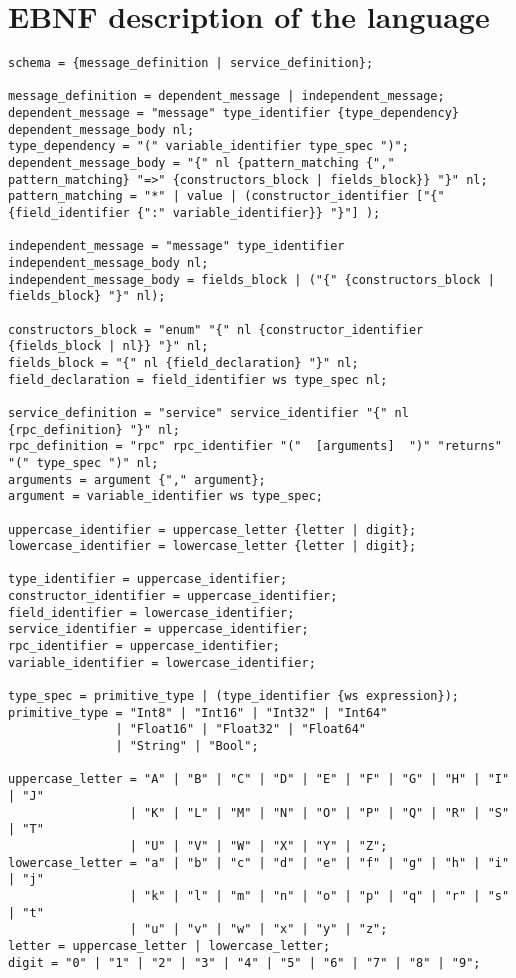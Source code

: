 \documentclass[conference]{IEEEtran}
\begin{document}
\section{EBNF description of the language}
\label{FirstAppendix}
\begin{lstlisting}
schema = {message_definition | service_definition};

message_definition = dependent_message | independent_message;
dependent_message = "message" type_identifier {type_dependency} dependent_message_body nl;
type_dependency = "(" variable_identifier type_spec ")";
dependent_message_body = "{" nl {pattern_matching {"," pattern_matching} "=>" {constructors_block | fields_block}} "}" nl;
pattern_matching = "*" | value | (constructor_identifier ["{" {field_identifier {":" variable_identifier}} "}"] );

independent_message = "message" type_identifier independent_message_body nl;
independent_message_body = fields_block | ("{" {constructors_block | fields_block} "}" nl);

constructors_block = "enum" "{" nl {constructor_identifier {fields_block | nl}} "}" nl;
fields_block = "{" nl {field_declaration} "}" nl;
field_declaration = field_identifier ws type_spec nl;

service_definition = "service" service_identifier "{" nl {rpc_definition} "}" nl;
rpc_definition = "rpc" rpc_identifier "("  [arguments]  ")" "returns" "(" type_spec ")" nl;
arguments = argument {"," argument};
argument = variable_identifier ws type_spec;

uppercase_identifier = uppercase_letter {letter | digit};
lowercase_identifier = lowercase_letter {letter | digit};

type_identifier = uppercase_identifier;
constructor_identifier = uppercase_identifier;
field_identifier = lowercase_identifier;
service_identifier = uppercase_identifier;
rpc_identifier = uppercase_identifier;
variable_identifier = lowercase_identifier;

type_spec = primitive_type | (type_identifier {ws expression});
primitive_type = "Int8" | "Int16" | "Int32" | "Int64"
               | "Float16" | "Float32" | "Float64"
               | "String" | "Bool";

uppercase_letter = "A" | "B" | "C" | "D" | "E" | "F" | "G" | "H" | "I" | "J"
                 | "K" | "L" | "M" | "N" | "O" | "P" | "Q" | "R" | "S" | "T"
                 | "U" | "V" | "W" | "X" | "Y" | "Z";
lowercase_letter = "a" | "b" | "c" | "d" | "e" | "f" | "g" | "h" | "i" | "j"
                 | "k" | "l" | "m" | "n" | "o" | "p" | "q" | "r" | "s" | "t"
                 | "u" | "v" | "w" | "x" | "y" | "z";
letter = uppercase_letter | lowercase_letter;
digit = "0" | "1" | "2" | "3" | "4" | "5" | "6" | "7" | "8" | "9";


\end{lstlisting}
\end{document}
